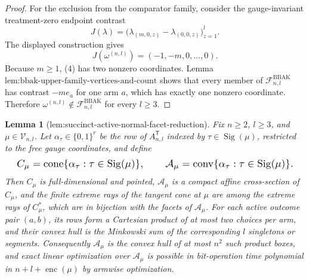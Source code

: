 \documentclass{article}
\newtheorem{lemma}{Lemma}
\begin{document}
\begin{proof}
For the exclusion from the comparator family, consider the gauge-invariant treatment-zero endpoint contrast
\[J(\lambda)=\bigl(\lambda_{(m,0,z)}-\lambda_{(0,0,z)}\bigr)_{z=1}^l.\]
The displayed construction gives
\[J(\omega^{(n,l)})=(-1,-m,0,\ldots,0).\tag{4}\]
Because \(m\ge1\), (4) has two nonzero coordinates. Lemma~\(\text{lem:bbak-upper-family-vertices-and-count}\) shows that every member of \(\mathcal F^{\mathrm{BBAK}}_{n,l}\) has contrast \(-m e_a\) for one arm \(a\), which has exactly one nonzero coordinate. Therefore \(\omega^{(n,l)}\notin\mathcal F^{\mathrm{BBAK}}_{n,l}\) for every \(l\ge3\).
\end{proof}

\begin{lemma}[lem:succinct-active-normal-facet-reduction]\label{lem:succinct-active-normal-facet-reduction}
Fix \(n\ge2\), \(l\ge3\), and \(\mu\in\mathcal V_{n,l}\). Let \(\alpha_\tau\in\{0,1\}^r\) be the row of \(A_{n,l}^{\mathsf T}\) indexed by \(\tau\in\operatorname{Sig}(\mu)\), restricted to the free gauge coordinates, and define \[
\makebox[\linewidth][c]{\resizebox{0.98\linewidth}{!}{\par\noindent \makebox[\linewidth][c]{\resizebox{0.98\linewidth}{!}{\(\displaystyle \displaystyle C_\mu=\operatorname{cone}\{\alpha_\tau:\tau\in\operatorname{Sig}(\mu)\},\qquad \mathcal A_\mu=\operatorname{conv}\{\alpha_\tau:\tau\in\operatorname{Sig}(\mu)\}.\)}}\par\noindent}}
\] Then \(C_\mu\) is full-dimensional and pointed, \(\mathcal A_\mu\) is a compact affine cross-section of \(C_\mu\), and the finite extreme rays of the tangent cone at \(\mu\) are among the extreme rays of \(C_\mu^*\), which are in bijection with the facets of \(\mathcal A_\mu\). For each active outcome pair \((a,b)\), its rows form a Cartesian product of at most two choices per arm, and their convex hull is the Minkowski sum of the corresponding \(l\) singletons or segments. Consequently \(\mathcal A_\mu\) is the convex hull of at most \(n^2\) such product boxes, and exact linear optimization over \(\mathcal A_\mu\) is possible in bit-operation time polynomial in \(n+l+\operatorname{enc}(\mu)\) by armwise optimization.
\end{lemma}
\end{document}
